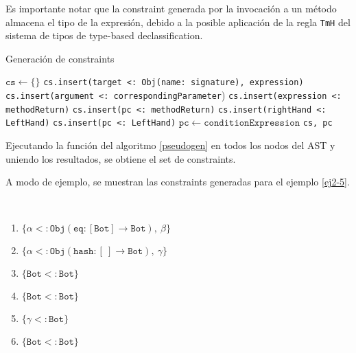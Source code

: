 Es importante notar que la constraint generada por la invocación a un método almacena el tipo de la expresión, debido a la posible aplicación de la regla \texttt{TmH} del sistema de tipos de type-based declassification.
\clearpage %
\begin{algorithm}\captionsetup{labelsep=newline}
  \centering
  \caption{Generación de constraints}
  \label{pseudogen}
    \begin{algorithmic}[1]
          \State $\mathtt{cs\gets \{\}}$
              \State \texttt{cs.insert(target <: Obj(name: signature), expression)}
                \State \texttt{cs.insert(argument <: correspondingParameter})
              \EndFor
            \EndCase
              \State \texttt{cs.insert(expression <: methodReturn)}
              \State \texttt{cs.insert(pc <: methodReturn)}
            \EndCase
              \State \texttt{cs.insert(rightHand <: LeftHand)}
              \State \texttt{cs.insert(pc <: LeftHand)}
            \EndCase
              \State $\mathtt{pc\gets conditionExpression}$
            \EndCase
          \EndSwitch
          \State \Return \texttt{cs, pc}
      \EndFunction
    \end{algorithmic}
\end{algorithm}
Ejecutando la función del algoritmo \ref{pseudogen} en todos los nodos del AST y uniendo los resultados, se obtiene el set de constraints.

A modo de ejemplo, se muestran las constraints generadas para el ejemplo \ref{ej2-5}.

\begin{ej}\ \\
  \label{ej3-1}
  \begin{enumerate}
    \item $\mathtt{\{\alpha <: Obj(eq : [Bot] \rightarrow Bot),\ \beta\}}$
    \item $\mathtt{\{\alpha <: Obj(hash : [\ ] \rightarrow Bot),\ \gamma\}}$
    \item $\mathtt{\{Bot <: Bot\}}$
    \item $\mathtt{\{Bot <: Bot\}}$
    \item $\mathtt{\{\gamma <: Bot\}}$
    \item $\mathtt{\{Bot <: Bot\}}$
  \end{enumerate}
\end{ej}


